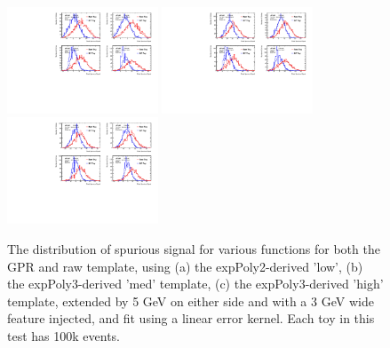 \begin{figure} 
\begin{center}
  \includegraphics[width=0.4\textwidth]{figures/background/gpr/validation/linear/ToyTest_FitSigVals_lowpT_100k_Sig}   
  \includegraphics[width=0.4\textwidth]{figures/background/gpr/validation/linear/ToyTest_FitSigVals_medpT_100k_Sig}   
  \includegraphics[width=0.4\textwidth]{figures/background/gpr/validation/linear/ToyTest_FitSigVals_highpT_100k_Sig}   
\caption{The distribution of spurious signal for various functions for both the GPR and raw template, using (a) the expPoly2-derived 'low', (b) the expPoly3-derived 'med' template, (c) the expPoly3-derived 'high' template, extended by 5 GeV on either side and with a 3 GeV wide feature injected, and fit using a linear error kernel. Each toy in this test has 100k events.}
\label{fig:linearkernel_lowpt_100k_Sig}
\end{center}
\end{figure}

